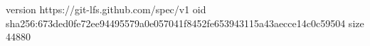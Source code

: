 version https://git-lfs.github.com/spec/v1
oid sha256:673ded0fe72ee94495579a0e057041f8452fe653943115a43aecce14c0c59504
size 44880
